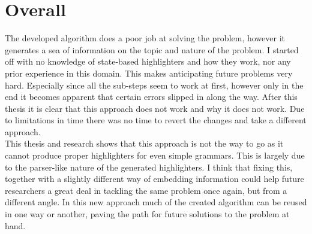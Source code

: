 \pagebreak
\section{Overall}
The developed algorithm does a poor job at solving the problem, however it generates a sea of information on the topic and nature of the problem. I started off with no knowledge of state-based highlighters and how they work, nor any prior experience in this domain. This makes anticipating future problems very hard. Especially since all the sub-steps seem to work at first, however only in the end it becomes apparent that certain errors slipped in along the way. After this thesis it is clear that this approach does not work and why it does not work. Due to limitations in time there was no time to revert the changes and take a different approach.\\
This thesis and research shows that this approach is not the way to go as it cannot produce proper highlighters for even simple grammars. This is largely due to the parser-like nature of the generated highlighters. I think that fixing this, together with a slightly different way of embedding information could help future researchers a great deal in tackling the same problem once again, but from a different angle. In this new approach much of the created algorithm can be reused in one way or another, paving the path for future solutions to the problem at hand.